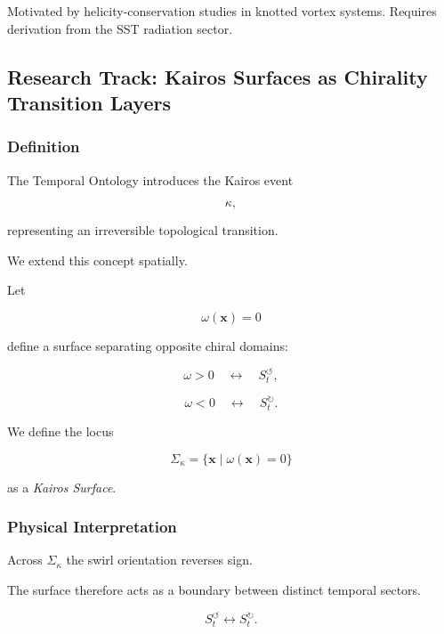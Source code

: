         Motivated by helicity-conservation studies in knotted vortex systems.
        Requires derivation from the SST radiation sector.
    
    
\subsection{Research Track: Kairos Surfaces as Chirality Transition Layers}
    
    \subsubsection{Definition}
        
        The Temporal Ontology introduces the Kairos event
        
        \[
            \kappa,
        \]
        
        representing an irreversible topological transition.
        
        We extend this concept spatially.
        
        Let
        
        \[
            \omega(\mathbf{x})=0
        \]
        
        define a surface separating opposite chiral domains:
        
        \[
            \omega>0
            \quad\leftrightarrow\quad
            S_t^{\circlearrowleft},
        \]
        
        \[
            \omega<0
            \quad\leftrightarrow\quad
            S_t^{\circlearrowright}.
        \]
        
        We define the locus
        
        \[
            \Sigma_\kappa
            =
            \{
            \mathbf{x}
            \;|\;
            \omega(\mathbf{x})=0
            \}
        \]
        
        as a \emph{Kairos Surface}.
    
    \subsubsection{Physical Interpretation}
        
        Across $\Sigma_\kappa$ the swirl orientation reverses sign.
        
        The surface therefore acts as a boundary between distinct temporal sectors.
        
        \[
            S_t^{\circlearrowleft}
            \longleftrightarrow
            S_t^{\circlearrowright}.
        \]
        
